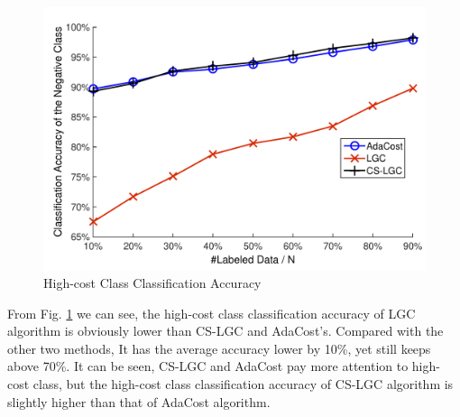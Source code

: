 \documentclass{svjour3}                     %
\begin{document}
\begin{figure}[H]
\includegraphics[width=\textwidth]{plot/fig4.pdf}
\caption{High-cost Class Classification Accuracy} \label{fig4}
\end{figure}

From Fig. \ref{fig4} we can see, the high-cost class classification accuracy of LGC algorithm is obviously lower than CS-LGC and AdaCost’s. Compared with the other two methods, It has the average accuracy lower by 10\%, yet still keeps above 70\%. It can be seen, CS-LGC and AdaCost pay more attention to high-cost class, but the high-cost class classification accuracy of CS-LGC algorithm is slightly higher than that of AdaCost algorithm.
\end{document}
